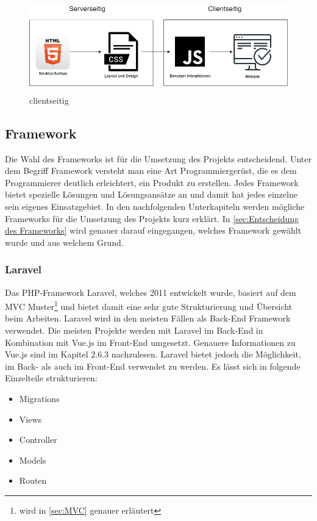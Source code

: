 \begin{figure}[h]
	\centering
	\includegraphics[height=4cm,width=12cm]{images/clientseitig}
	\caption{clientseitig}
	\label{fig:clientseitig}
\end{figure}
\newpage
\subsection{Framework}
Die Wahl des Frameworks ist für die Umsetzung des Projekts entscheidend. Unter dem Begriff Framework versteht man eine Art Programmiergerüst, die es dem Programmierer deutlich erleichtert, ein Produkt zu erstellen. Jedes Framework bietet spezielle Lösungen und Lösungsansätze an und damit hat jedes einzelne sein eigenes Einsatzgebiet. In den nachfolgenden Unterkapiteln werden mögliche Frameworks für die Umsetzung des Projekts kurz erklärt. In \ref{sec:Entscheidung des Frameworks} wird genauer darauf eingegangen, welches Framework gewählt wurde und aus welchem Grund.

\subsubsection{Laravel}
Das PHP-Framework Laravel, welches 2011 entwickelt wurde, basiert auf dem MVC Muster\footnote{wird in  \autoref{sec:MVC} genauer erläutert} und bietet damit eine sehr gute Strukturierung und Übersicht beim Arbeiten. Laravel wird in den meisten Fällen als Back-End Framework verwendet. Die meisten Projekte werden mit Laravel im Back-End in Kombination mit Vue.js im Front-End umgesetzt. Genauere Informationen  zu Vue.js sind im Kapitel 2.6.3 nachzulesen. Laravel bietet jedoch die Möglichkeit, im Back- als auch im Front-End verwendet zu werden. Es lässt sich in folgende Einzelteile strukturieren:

\begin{itemize}
	\item Migrations 
	\item Views
	\item Controller 
	\item Models
	\item Routen 
\end{itemize}


